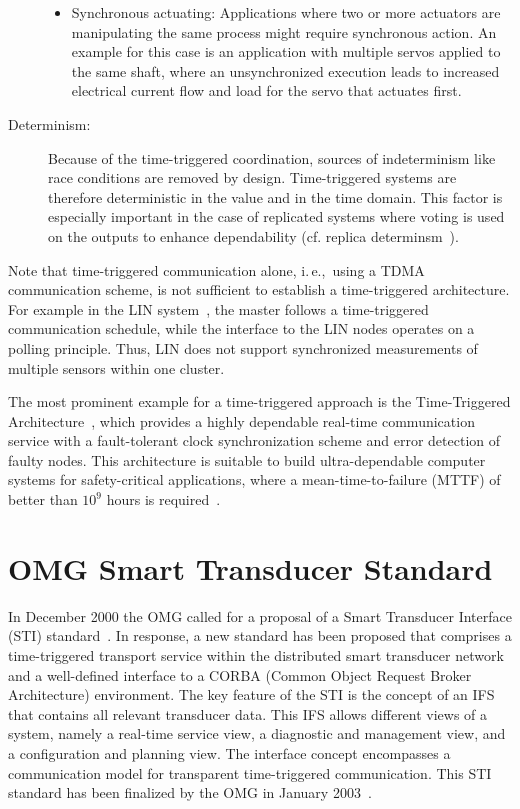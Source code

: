 \documentclass[11pt,a4paper,]{article}
\def\ie{i.\,e.,~}
\begin{document}
\begin{description}
\begin{itemize}
\item Synchronous actuating: Applications where two or more
actuators are manipulating the same process might require
synchronous action. An example for this case is an application
with multiple servos applied to the same shaft, where an
unsynchronized execution leads to increased electrical current
flow and load for the servo that actuates first.

\end{itemize}

\item[Determinism:] Because of the time-triggered coordination,
sources of indeterminism like race conditions are removed by
design. Time-triggered systems are therefore deterministic in the
value and in the time domain. This factor is especially important
in the case of replicated systems where voting is used on the
outputs to enhance dependability (cf. replica
determinsm~\cite{poledna:diss}).

\end{description}

Note that time-triggered communication alone, \ie using a \ac{TDMA}
communication scheme, is not sufficient to establish a
time-triggered architecture. For example in the \ac{LIN}
system~\cite{linspec}, the master follows a time-triggered
communication schedule, while the interface to the \ac{LIN} nodes
operates on a polling principle. Thus, \ac{LIN} does not support
synchronized measurements of multiple sensors within one cluster.

The most prominent example for a time-triggered approach is the
Time-Triggered Architecture~\cite{kopetz:2001-22}, which provides
a highly dependable real-time communication service with a
fault-tolerant clock synchronization scheme and error detection of
faulty nodes. This architecture is suitable to build
ultra-dependable computer systems for safety-critical
applications, where a mean-time-to-failure (MTTF) of better than
$10^{9}$ hours is required~\cite{suri:95,kopetz:faulthypothesis}.

\section{OMG Smart Transducer Standard} \label{sec:omg-transducer-standard}

In December 2000 the \ac{OMG} called for a proposal of a Smart
Transducer Interface (STI)
standard~\cite{omg:SmartTransducerInterfaceRFP}. In response, a new
standard has been proposed that comprises a time-triggered transport
service within the distributed smart transducer network and a
well-defined interface to a CORBA (Common Object Request Broker
Architecture) environment. The key feature of the STI is the concept
of an \ac{IFS} that contains all relevant transducer data. This
\ac{IFS} allows different views of a system, namely a real-time
service view, a diagnostic and management view, and a configuration
and planning view. The interface concept encompasses a communication
model for transparent time-triggered communication. This STI
standard has been finalized by the \ac{OMG} in January
2003~\cite{omg:SmartTransducerInterface1.0}.
\end{document}
